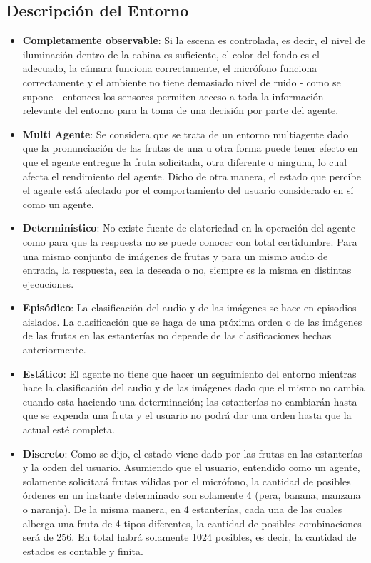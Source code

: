 \documentclass[a4paper, 12pt]{article}
\begin{document}
\subsection{Descripción del Entorno}
\begin{itemize}
\item \textbf{Completamente observable}: Si la escena es controlada, es decir, el nivel de iluminación dentro de la cabina es suficiente, el color del fondo es el adecuado, la cámara funciona correctamente, el micrófono funciona correctamente y el ambiente no tiene demasiado nivel de ruido - como se supone - entonces los sensores permiten acceso a toda la información relevante del entorno para la toma de una decisión por parte del agente.
\item \textbf{Multi Agente}: Se considera que se trata de un entorno multiagente dado que la pronunciación de las frutas de una u otra forma puede tener efecto en que el agente entregue la fruta solicitada, otra diferente o ninguna, lo cual afecta el rendimiento del agente. Dicho de otra manera, el estado que percibe el agente está afectado por el comportamiento del usuario considerado en sí como un agente.
\item \textbf{Determinístico}: No existe fuente de elatoriedad en la operación del agente como para que la respuesta no se puede conocer con total certidumbre. Para una mismo conjunto de imágenes de frutas y para un mismo audio de entrada, la respuesta, sea la deseada o no, siempre es la misma en distintas ejecuciones.
\item \textbf{Episódico}: La clasificación del audio y de las imágenes se hace en episodios aislados. La clasificación que se haga de una próxima orden o de las imágenes de las frutas en las estanterías no depende de las clasificaciones hechas anteriormente.
\item \textbf{Estático}: El agente no tiene que hacer un seguimiento del entorno mientras hace la clasificación del audio y de las imágenes dado que el mismo no cambia cuando esta haciendo una determinación; las estanterías no cambiarán hasta que se expenda una fruta y el usuario no podrá dar una orden hasta que la actual esté completa.
\item \textbf{Discreto}: Como se dijo, el estado viene dado por las frutas en las estanterías y la orden del usuario. Asumiendo que el usuario, entendido como un agente, solamente solicitará frutas válidas por el micrófono, la cantidad de posibles órdenes en un instante determinado son solamente 4 (pera, banana, manzana o naranja). De la misma manera, en 4 estanterías, cada una de las cuales alberga una fruta de 4 tipos diferentes, la cantidad de posibles combinaciones será de 256. En total habrá solamente 1024 posibles, es decir, la cantidad de estados es contable y finita.
\end{itemize}
\end{document}
